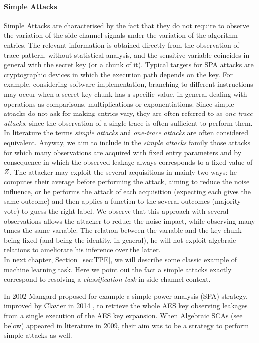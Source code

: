 \paragraph{Simple Attacks}
Simple Attacks are characterised by the fact that they do not require to observe the variation of the side-channel signals under the variation of the algorithm entries. The relevant information is obtained directly from the observation of trace pattern, without statistical analysis, and the sensitive variable coincides in general with the secret key (or a chunk of it). Typical targets for SPA attacks are cryptographic devices in which the execution path depends on the key. For example, considering software-implementation, branching to different instructions may occur when a secret key chunk has a specific value, in general dealing with operations as comparisons, multiplications or exponentiations. Since simple attacks do not ask for making entries vary, they are often referred to as \emph{one-trace attacks}, since the observation of a single trace is often sufficient to perform them. In literature the terms \emph{simple attacks} and \emph{one-trace attacks} are often considered equivalent. Anyway, we aim to include in the \emph{simple attacks} family those attacks for which many observations are acquired with fixed entry parameters and by consequence in which the observed leakage always corresponds to a fixed value of $Z$. The attacker may exploit the several acquisitions in mainly two ways: he computes their average before performing the attack, aiming to reduce the noise influence, or he performs the attack of each acquisition (expecting each gives the same outcome) and then applies a function to the several outcomes (\eg majority vote) to guess the right label. We observe that this approach with several observations allows the attacker to reduce the noise impact, while observing many times the same variable. The relation between the variable and the key chunk being fixed (and being the identity, in general), he will not exploit algebraic relations to ameliorate his inference over the latter. \\
In next chapter, Section~\ref{sec:TPE}, we will describe some classic example of machine learning task. Here we point out the fact a simple attacks exactly correspond to resolving a \emph{classification task} in side-channel context. 

% 
 In 2002 Mangard \etal  \cite{mangard2002simple} proposed for example a simple power analysis (SPA) strategy, improved by Clavier \etal in 2014 \cite{clavier2014simple}, to retrieve the whole AES key observing leakages from a single execution of the AES key expansion. When Algebraic SCAs (see below) appeared in literature in 2009, their aim was to be a strategy to perform simple attacks as well.  


